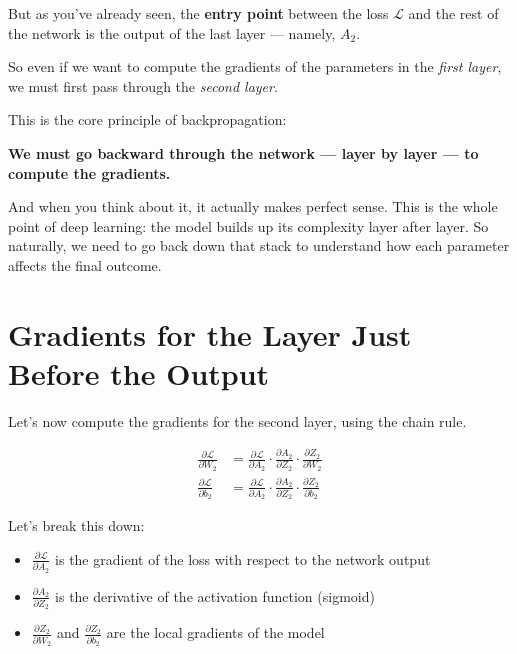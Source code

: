 \documentclass[11pt]{article}
\begin{document}
But as you’ve already seen, the \textbf{entry point} between the loss $\mathcal{L}$ and the rest of the network is the output of the last layer — namely, $A_2$.

So even if we want to compute the gradients of the parameters in the \textit{first layer},  
we must first pass through the \textit{second layer}.

\begin{insightbox}[title=Key Insight]
This is the core principle of backpropagation:

\textbf{We must go backward through the network — layer by layer — to compute the gradients.}
\end{insightbox}

And when you think about it, it actually makes perfect sense.  
This is the whole point of deep learning: the model builds up its complexity layer after layer.  
So naturally, we need to go back down that stack to understand how each parameter affects the final outcome.

\section{Gradients for the Layer Just Before the Output}

Let’s now compute the gradients for the second layer, using the chain rule.

\[
\begin{aligned}
\frac{\partial \mathcal{L}}{\partial W_2} &= 
\frac{\partial \mathcal{L}}{\partial A_2} \cdot 
\frac{\partial A_2}{\partial Z_2} \cdot 
\frac{\partial Z_2}{\partial W_2} \\[1em]
\frac{\partial \mathcal{L}}{\partial b_2} &= 
\frac{\partial \mathcal{L}}{\partial A_2} \cdot 
\frac{\partial A_2}{\partial Z_2} \cdot 
\frac{\partial Z_2}{\partial b_2}
\end{aligned}
\]

Let’s break this down:

\begin{itemize}
    \item $\frac{\partial \mathcal{L}}{\partial A_2}$ is the gradient of the loss with respect to the network output
    \item $\frac{\partial A_2}{\partial Z_2}$ is the derivative of the activation function (sigmoid)
    \item $\frac{\partial Z_2}{\partial W_2}$ and $\frac{\partial Z_2}{\partial b_2}$ are the local gradients of the model
\end{itemize}
\end{document}
